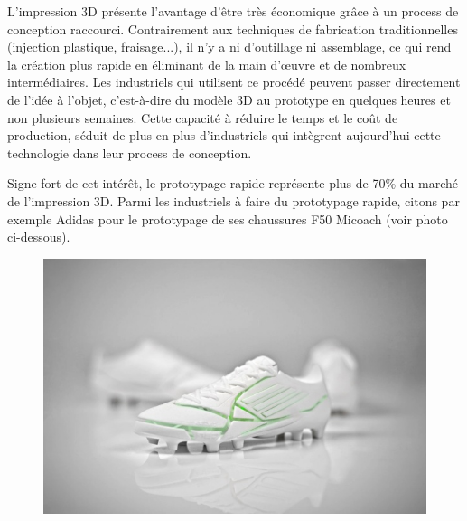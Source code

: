 \documentclass{article}
\begin{document}
L'impression 3D présente l'avantage d'être très économique grâce à un process de conception raccourci. Contrairement aux techniques de fabrication traditionnelles (injection plastique, fraisage...), il n'y a ni d'outillage ni assemblage, ce qui rend la création plus rapide en éliminant de la main d'œuvre et de nombreux intermédiaires. Les industriels qui utilisent ce procédé peuvent passer directement de l'idée à l'objet, c'est-à-dire du modèle 3D au prototype en quelques heures et non plusieurs semaines. Cette capacité à réduire le temps et le coût de production, séduit de plus en plus d'industriels qui intègrent aujourd'hui cette technologie dans leur process de conception. \hfill

Signe fort de cet intérêt, le prototypage rapide représente plus de 70\% du marché de l'impression 3D. Parmi les industriels à faire du prototypage rapide, citons par exemple Adidas pour le prototypage de ses chaussures F50 Micoach (voir photo ci-dessous).
\begin{figure}[h!]
\centering
\includegraphics[scale=0.4]{./images/prototype-F50-Micoach.png}
\end{figure}
\end{document}
